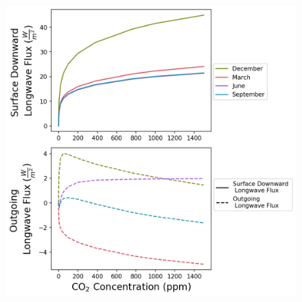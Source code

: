 \documentclass[draft]{agujournal2019}
\begin{document}
\begin{figure}[htb!]
\noindent\includegraphics[width=1\textwidth]{figures/GH_sfc_CO2_effect.png}
\centering
\caption{}
\label{fig:sfc_toa_GHE}
\end{figure}
\end{document}
